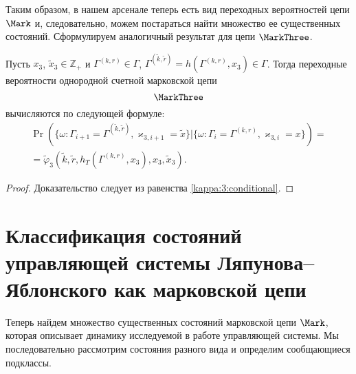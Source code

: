 Таким образом,  в нашем арсенале теперь есть вид переходных вероятностей цепи $\Mark$ и,  следовательно,  можем постараться найти множество ее существенных состояний. Сформулируем аналогичный результат для цепи $\MarkThree$.
\begin{theorem}
Пусть $x_3$,  $\tilde{x}_3\in \mathbb{Z}_+$ и $\Gamma^{(k, r)}\in \Gamma$,  $\Gamma^{(\tilde{k}, \tilde{r})}=h(\Gamma^{(k, r)}, x_3) \in \Gamma$. Тогда переходные вероятности однородной счетной марковской цепи $$
\MarkThree
$$
вычисляются по следующей формуле:
\begin{multline}
\Pr (\{\omega\colon\Gamma_{i+1}=\Gamma^{(\tilde{k}, \tilde{r})}, \varkappa_{3, i+1}=\tilde{x}\}|\{\omega\colon\Gamma_{i}=\Gamma^{(k, r)}, \varkappa_{3, i}=x\}) 
= \\ =\widetilde{\varphi}_3(\tilde{k}, \tilde{r}, h_T(\Gamma^{(k, r)}, x_3), x_3, \tilde{x}_3).
\label{transitionToProve:three}
\end{multline}
\end{theorem}
\begin{proof}
Доказательство следует из равенства \eqref{kappa:3:conditional}.
\end{proof}


\section[Классификация состояний управляющей системы Ляпунова--Яблонского как марковской цепи]%
{Классификация состояний управляющей системы Ляпунова--Яблонского  как марковской цепи}
Теперь найдем множество существенных состояний марковской цепи $\Mark$,  которая описывает динамику исследуемой в работе управляющей системы. Мы последовательно рассмотрим состояния разного вида и определим сообщающиеся подклассы. 

